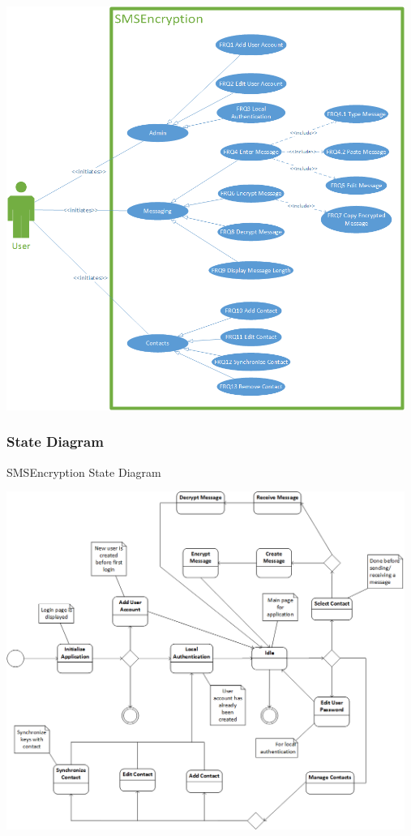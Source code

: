 \begin{center}
 \includegraphics[width=13cm]{diagrams/UseCaseDiagrams/UsecaseV5.png}
\end{center}

\subsubsection{State Diagram}
SMSEncryption State Diagram

\begin{center}
 \includegraphics[width=13cm]{diagrams/StateDiagrams/SMSEncryptionStateMachine.png}
\end{center}


